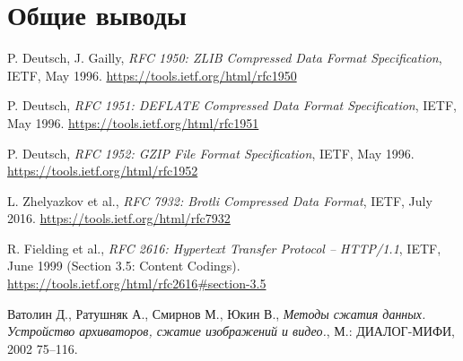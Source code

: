\documentclass[12pt]{article}
\begin{document}
\section{Общие выводы}

\begin{thebibliography}{9}
    P. Deutsch, J. Gailly,
    \textit{RFC 1950: ZLIB Compressed Data Format Specification},
    IETF, May 1996.
    \url{https://tools.ietf.org/html/rfc1950}

    P. Deutsch,
    \textit{RFC 1951: DEFLATE Compressed Data Format Specification},
    IETF, May 1996.
    \url{https://tools.ietf.org/html/rfc1951}

    P. Deutsch,
    \textit{RFC 1952: GZIP File Format Specification},
    IETF, May 1996.
    \url{https://tools.ietf.org/html/rfc1952}

    L. Zhelyazkov et al.,
    \textit{RFC 7932: Brotli Compressed Data Format},
    IETF, July 2016.
    \url{https://tools.ietf.org/html/rfc7932}

    R. Fielding et al.,
    \textit{RFC 2616: Hypertext Transfer Protocol -- HTTP/1.1},
    IETF, June 1999 (Section 3.5: Content Codings).
    \url{https://tools.ietf.org/html/rfc2616#section-3.5}

    Ватолин Д., Ратушняк А., Смирнов М., Юкин В.,
    \textit{Методы сжатия данных. Устройство архиваторов, сжатие изображений и видео.},
    М.: ДИАЛОГ-МИФИ, 2002 75--116.

\end{thebibliography}
\end{document}
